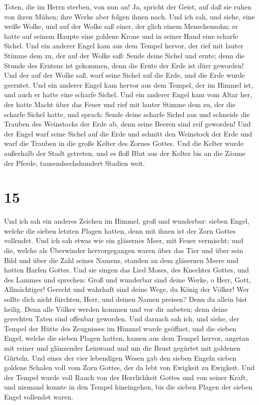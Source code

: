 Toten, die im Herrn sterben, von nun an! Ja, spricht der Geist, auf daß
sie ruhen von ihren Mühen; ihre Werke aber folgen ihnen nach.
 Und ich sah, und siehe, eine weiße Wolke, und auf der
Wolke saß einer, der glich einem Menschensohn; er hatte auf seinem
Haupte eine goldene Krone und in seiner Hand eine scharfe Sichel.
 Und ein anderer Engel kam aus dem Tempel hervor, der
rief mit lauter Stimme dem zu, der auf der Wolke saß: Sende deine Sichel
und ernte; denn die Stunde des Erntens ist gekommen, denn die Ernte der
Erde ist dürr geworden!  Und der auf der Wolke saß, warf
seine Sichel auf die Erde, und die Erde wurde geerntet. 
Und ein anderer Engel kam hervor aus dem Tempel, der im Himmel ist, und
auch er hatte eine scharfe Sichel.  Und ein anderer Engel
kam vom Altar her, der hatte Macht über das Feuer und rief mit lauter
Stimme dem zu, der die scharfe Sichel hatte, und sprach: Sende deine
scharfe Sichel aus und schneide die Trauben des Weinstocks der Erde ab,
denn seine Beeren sind reif geworden!  Und der Engel warf
seine Sichel auf die Erde und schnitt den Weinstock der Erde und warf
die Trauben in die große Kelter des Zornes Gottes.  Und
die Kelter wurde außerhalb der Stadt getreten, und es floß Blut aus der
Kelter bis an die Zäume der Pferde, tausendsechshundert Stadien weit.

\hypertarget{section-14}{%
\section{15}\label{section-14}}

 Und ich sah ein anderes Zeichen im Himmel, groß und
wunderbar: sieben Engel, welche die sieben letzten Plagen hatten, denn
mit ihnen ist der Zorn Gottes vollendet.  Und ich sah
etwas wie ein gläsernes Meer, mit Feuer vermischt; und die, welche als
Überwinder hervorgegangen waren über das Tier und über sein Bild und
über die Zahl seines Namens, standen an dem gläsernen Meere und hatten
Harfen Gottes.  Und sie singen das Lied Moses, des
Knechtes Gottes, und des Lammes und sprechen: Groß und wunderbar sind
deine Werke, o Herr, Gott, Allmächtiger! Gerecht und wahrhaft sind deine
Wege, du König der Völker!  Wer sollte dich nicht
fürchten, Herr, und deinen Namen preisen? Denn du allein bist heilig.
Denn alle Völker werden kommen und vor dir anbeten; denn deine gerechten
Taten sind offenbar geworden.  Und darnach sah ich, und
siehe, der Tempel der Hütte des Zeugnisses im Himmel wurde geöffnet,
 und die sieben Engel, welche die sieben Plagen hatten,
kamen aus dem Tempel hervor, angetan mit reiner und glänzender Leinwand
und um die Brust gegürtet mit goldenen Gürteln.  Und eines
der vier lebendigen Wesen gab den sieben Engeln sieben goldene Schalen
voll vom Zorn Gottes, der da lebt von Ewigkeit zu Ewigkeit.
 Und der Tempel wurde voll Rauch von der Herrlichkeit
Gottes und von seiner Kraft, und niemand konnte in den Tempel
hineingehen, bis die sieben Plagen der sieben Engel vollendet waren.

